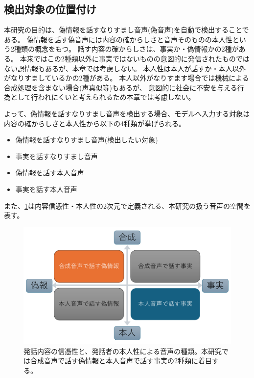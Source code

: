 \subsection{検出対象の位置付け}
本研究の目的は、偽情報を話すなりすまし音声(偽音声)を自動で検出することである。
偽情報を話す偽音声には内容の確からしさと音声そのものの本人性という2種類の概念をもつ。
話す内容の確からしさは、事実か・偽情報かの2種がある。
本来ではこの2種類以外に事実ではないものの意図的に発信されたものではない誤情報もあるが、本章では考慮しない。
本人性は本人が話すか・本人以外がなりすましているかの2種がある。
本人以外がなりすます場合では機械による合成処理を含まない場合(声真似等)もあるが、
意図的に社会に不安を与える行為として行われにくいと考えられるため本章では考慮しない。

よって、偽情報を話すなりすまし音声を検出する場合、モデルへ入力する対象は内容の確からしさと本人性から以下の4種類が挙げられる。

\begin{itemize}
    \item 偽情報を話すなりすまし音声(検出したい対象)
    \item 事実を話すなりすまし音声
    \item 偽情報を話す本人音声
    \item 事実を話す本人音声
\end{itemize}

また、\cref{fig:twoPerspective}は内容信憑性・本人性の2次元で定義される、本研究の扱う音声の空間を表す。

\begin{figure}[h]
    \centering
    \includegraphics[width=\linewidth]{figures/D論概念図.pdf}
    \caption{発話内容の信憑性と、発話者の本人性による音声の種類。本研究では合成音声で話す偽情報と本人音声で話す事実の2種類に着目する。}
    \label{fig:twoPerspective}
\end{figure}

